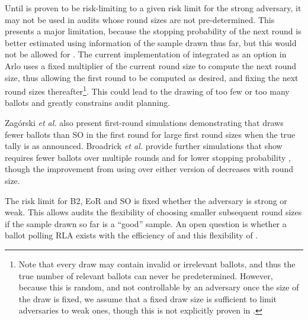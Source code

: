 Until \Minerva is proven to be risk-limiting to a given risk limit for the strong adversary, it may not be used in audits whose round sizes are not pre-determined. This presents a major limitation, because the stopping probability of the next round is better estimated using information of the sample drawn thus far, but this would not be allowed for \Minerva. The current implementation of \Minerva integrated as an option in Arlo uses a fixed multiplier of the current round size to compute the next round size, thus allowing the first round to be computed as desired, and fixing the next round sizes thereafter\footnote{Note that every draw may contain invalid or irrelevant ballots, and thus the true number of relevant ballots can never be predetermined. However, because this is random, and not controllable by an adversary once the size of the draw is fixed, we assume that a fixed draw size is sufficient to limit adversaries to weak ones, though this is not explicitly proven in \cite{usenix_minerva}.}. This could lead to the drawing of too few or too many ballots and greatly constrains audit planning.  


Zag\'{o}rski {\em et al.}  also present first-round simulations demonstrating that \Minerva draws fewer ballots than SO \BRAVO in the first round for large first round sizes when the true tally is as announced. 
Broadrick {\em et al.} provide further simulations that show \Minerva requires fewer ballots over multiple rounds and for lower stopping probability \cite{simulations}, though the improvement from using \Minerva over either version of \BRAVO decreases with round size. 

The risk limit for B2, EoR and SO \BRAVO is fixed whether the adversary is strong or weak. This allows \BRAVO audits the flexibility of choosing smaller subsequent round sizes if the sample drawn so far is a ``good'' sample. An open question is whether a ballot polling RLA exists with the efficiency of \Minerva and this flexibility of \BRAVO.

